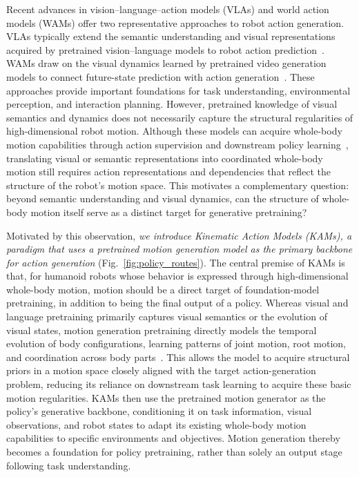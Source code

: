 Recent advances in vision--language--action models (VLAs) and world action models (WAMs) offer two representative approaches to robot action generation. VLAs typically extend the semantic understanding and visual representations acquired by pretrained vision--language models to robot action prediction~\citep{rt2,openvla,pi0,grootn1}. WAMs draw on the visual dynamics learned by pretrained video generation models to connect future-state prediction with action generation~\citep{dreamzero,motionwam,wholebodywam_wbc}. These approaches provide important foundations for task understanding, environmental perception, and interaction planning. However, pretrained knowledge of visual semantics and dynamics does not necessarily capture the structural regularities of high-dimensional robot motion. Although these models can acquire whole-body motion capabilities through action supervision and downstream policy learning~\citep{wholebodyvla}, translating visual or semantic representations into coordinated whole-body motion still requires action representations and dependencies that reflect the structure of the robot's motion space. This motivates a complementary question: beyond semantic understanding and visual dynamics, can the structure of whole-body motion itself serve as a distinct target for generative pretraining?

Motivated by this observation, \textit{we introduce Kinematic Action Models (KAMs), a paradigm that uses a pretrained motion generation model as the primary backbone for action generation} (Fig.~\ref{fig:policy_routes}). The central premise of KAMs is that, for humanoid robots whose behavior is expressed through high-dimensional whole-body motion, motion should be a direct target of foundation-model pretraining, in addition to being the final output of a policy. Whereas visual and language pretraining primarily captures visual semantics or the evolution of visual states, motion generation pretraining directly models the temporal evolution of body configurations, learning patterns of joint motion, root motion, and coordination across body parts~\citep{mdm,kimodo}. This allows the model to acquire structural priors in a motion space closely aligned with the target action-generation problem, reducing its reliance on downstream task learning to acquire these basic motion \mbox{regularities}. KAMs then use the pretrained motion generator as the policy's generative backbone, conditioning it on task information, visual observations, and robot states to adapt its existing whole-body motion capabilities to specific environments and objectives. Motion generation thereby becomes a foundation for policy pretraining, rather than solely an output stage following task understanding.

